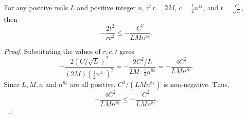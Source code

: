 \begin{helper}
For any positive reals \(L\) and positive integer \(n\), if \(r=2M\), \(c=\frac{1}{2}n^{4\varepsilon}\), and \(t=\frac{C}{\sqrt{L}}\), then
\[
-\frac{2t^2}{rc^2} \le -\frac{C^2}{LMn^{8\varepsilon}}.
\]
\end{helper}
\begin{proof}
Substituting the values of \(r, c, t\) gives
\[
-\frac{2(C/\sqrt{L})^2}{(2M)(\frac{1}{2}n^{4\varepsilon})^2}
= -\frac{2C^2/L}{2M \cdot \frac{1}{4}n^{8\varepsilon}}
= -\frac{4C^2}{L M n^{8\varepsilon}}.
\]
Since \(L, M, n\) and \(n^{8\varepsilon}\) are all positive, \(C^2 / (LMn^{8\varepsilon})\) is non-negative.
Thus,
\[
-\frac{4C^2}{L M n^{8\varepsilon}} \le -\frac{C^2}{LMn^{8\varepsilon}}.
\]
\end{proof}
